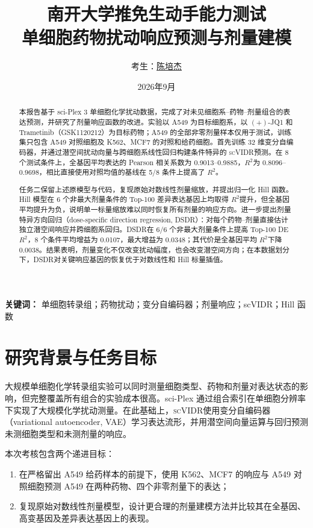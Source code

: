 \documentclass[UTF8,11pt,a4paper,fontset=fandol]{ctexart}
\title{\bfseries 南开大学推免生动手能力测试\\[0.8em]
\LARGE 单细胞药物扰动响应预测与剂量建模}
\author{考生：\underline{陈培杰}}
\date{2026年9月}
\newcommand{\scvidr}{\textsc{scVIDR}}
\newcommand{\dsdr}{\textsc{DSDR}}
\newcommand{\Rtwo}{\ensuremath{R^2}}
\begin{document}
\maketitle
\thispagestyle{empty}
\vspace{1.5cm}

\begin{abstract}
本报告基于 sci-Plex 3 单细胞化学扰动数据，完成了对未见细胞系--药物--剂量组合的表达预测，并研究了剂量响应函数的改进。实验以 A549 为目标细胞系，以 $(+)$-JQ1 和 Trametinib（GSK1120212）为目标药物；A549 的全部非零剂量样本仅用于测试，训练集只包含 A549 对照细胞及 K562、MCF7 的对照和给药细胞。首先训练 32 维变分自编码器，并通过潜空间扰动向量与跨细胞系线性回归构建条件特异的 \scvidr 预测。在 8 个测试条件上，全基因平均表达的 Pearson 相关系数为 0.9013--0.9885，\Rtwo 为 0.8096--0.9698，相比直接使用对照均值的基线在 5/8 条件上提高了 \Rtwo。

任务二保留上述原模型与代码，复现原始对数线性剂量缩放，并提出归一化 Hill 函数。Hill 模型在 6 个非最大剂量条件的 Top-100 差异表达基因上均取得 \Rtwo 提升，但全基因平均提升为负，说明单一标量缩放难以同时恢复所有剂量的响应方向。进一步提出剂量特异方向回归（dose-specific direction regression, \dsdr）：对每个药物--剂量直接估计独立潜空间响应并跨细胞系回归。\dsdr 在 6/6 个非最大剂量条件上提高 Top-100 DE \Rtwo，8 个条件平均增益为 0.0107，最大增益为 0.0348；其代价是全基因平均 \Rtwo 下降 0.0038。结果表明，剂量变化不仅改变扰动幅度，也会改变潜空间方向；在本数据划分下，\dsdr 对关键响应基因的恢复优于对数线性和 Hill 标量插值。
\end{abstract}

\noindent\textbf{关键词：} 单细胞转录组；药物扰动；变分自编码器；剂量响应；scVIDR；Hill 函数

\clearpage
\tableofcontents
\clearpage

\section{研究背景与任务目标}

大规模单细胞化学转录组实验可以同时测量细胞类型、药物和剂量对表达状态的影响，但完整覆盖所有组合的实验成本很高。sci-Plex 通过组合索引在单细胞分辨率下实现了大规模化学扰动测量\cite{srivatsan2020}。在此基础上，\scvidr 使用变分自编码器（variational autoencoder, VAE）学习表达流形，并用潜空间向量运算与回归预测未测细胞类型和未测剂量的响应\cite{kana2023}。

本次考核包含两个递进目标：

\begin{enumerate}
  \item 在严格留出 A549 给药样本的前提下，使用 K562、MCF7 的响应与 A549 对照细胞预测 A549 在两种药物、四个非零剂量下的表达；
  \item 复现原始对数线性剂量模型，设计更合理的剂量建模方法并比较其在全基因、高变基因及差异表达基因上的表现。
\end{enumerate}
\end{document}
